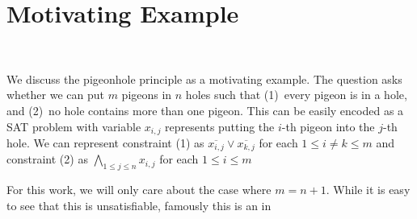 \section{Motivating Example}~\label{sec:motivatex}

We discuss the pigeonhole principle as a motivating example. The question asks 
whether we can put $m$ pigeons in $n$ holes such that (1)~every pigeon is in a 
hole, and (2)~no hole contains more than one pigeon. This can be easily 
encoded as a SAT problem with variable $x_{i, j}$ represents putting the 
$i$-th pigeon into the $j$-th hole. We can represent constraint (1) as 
$\overline{x_{i, j}} \lor \overline{x_{k, j}}$ for each $ 1 \leq i \neq k \leq 
m$ and constraint (2) as $\bigwedge_{1 \leq j \leq n} x_{i, j}$ for each $1 
\leq i \leq m$

For this work, we will only care about the case where $m = n + 1$. While it is easy to see that this is unsatisfiable, famously this is an in